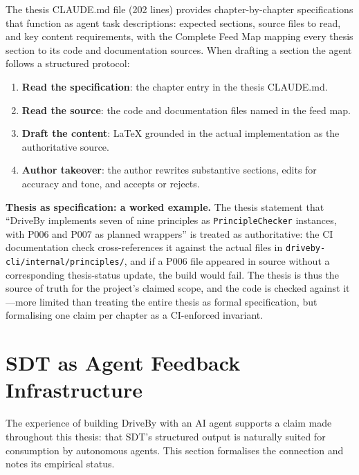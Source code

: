 The thesis CLAUDE.md file (202 lines) provides chapter-by-chapter specifications that function as agent task descriptions: expected sections, source files to read, and key content requirements, with the Complete Feed Map mapping every thesis section to its code and documentation sources. When drafting a section the agent follows a structured protocol:

\begin{enumerate}
    \item \textbf{Read the specification}: the chapter entry in the thesis CLAUDE.md.
    \item \textbf{Read the source}: the code and documentation files named in the feed map.
    \item \textbf{Draft the content}: LaTeX grounded in the actual implementation as the authoritative source.
    \item \textbf{Author takeover}: the author rewrites substantive sections, edits for accuracy and tone, and accepts or rejects.
\end{enumerate}

\textbf{Thesis as specification: a worked example.} The thesis statement that ``DriveBy implements seven of nine principles as \texttt{PrincipleChecker} instances, with P006 and P007 as planned wrappers'' is treated as authoritative: the CI documentation check cross-references it against the actual files in \texttt{driveby-cli/\allowbreak internal/principles/}, and if a P006 file appeared in source without a corresponding thesis-status update, the build would fail. The thesis is thus the source of truth for the project's claimed scope, and the code is checked against it---more limited than treating the entire thesis as formal specification, but formalising one claim per chapter as a CI-enforced invariant.

\section{SDT as Agent Feedback Infrastructure}
\label{sec:ddt-agent-feedback}

The experience of building DriveBy with an AI agent supports a claim made throughout this thesis: that SDT's structured output is naturally suited for consumption by autonomous agents. This section formalises the connection and notes its empirical status.

